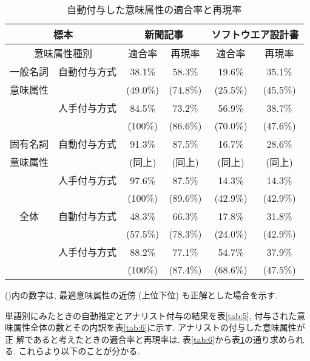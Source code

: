 \begin{table}[htbp]
  \caption{自動付与した意味属性の適合率と再現率}
  \label{tab:7}
  \begin{center}
    \leavevmode
    \begin{tabular}{|c|c|c|c|c|c|}
      \hline
      \multicolumn{2}{|c|}{標本} & \multicolumn{2}{|c|}{新聞記事} & \multicolumn{2}{|c|}{ソフトウエア設計書} \\\hline
      \multicolumn{2}{|c|}{意味属性種別} & 適合率 & 再現率 & 適合率 & 再現率 \\\hline
      一般名詞 & 自動付与方式 & 38.1\% & 58.3\% & 19.6\% & 35.1\% \\
      意味属性 & & (49.0\%) & (74.8\%) & (25.5\%) & (45.5\%) \\\cline{2-6}
      & 人手付与方式 & 84.5\% & 73.2\% & 56.9\% & 38.7\% \\
      & & (100\%) & (86.6\%) & (70.0\%) & (47.6\%) \\\hline
      固有名詞 & 自動付与方式 & 91.3\% & 87.5\% & 16.7\% & 28.6\% \\
      意味属性 & & (同上) & (同上) & (同上) & (同上) \\\cline{2-6}
      & 人手付与方式 & 97.6\% & 87.5\% & 14.3\% & 14.3\% \\
      & & (100\%) & (89.6\%) & (42.9\%) & (42.9\%) \\\hline
      全体 & 自動付与方式 & 48.3\% & 66.3\% & 17.8\% & 31.8\% \\
      & & (57.5\%) & (78.3\%) & (24.0\%) & (42.9\%) \\\cline{2-6}
      & 人手付与方式 & 88.2\% & 77.1\% & 54.7\% & 37.9\% \\
      & & (100\%) & (87.4\%) & (68.6\%) & (47.5\%) \\ \hline
    \end{tabular}

    \vspace{1.5mm} ()内の数字は, 最適意味属性の近傍 (上位下位) も正解とした場合を示す. 
  \end{center}
\end{table}

単語別にみたときの自動推定とアナリスト付与の結果を表\ref{tab:5}, 付与された意
味属性全体の数とその内訳を表\ref{tab:6}に示す. アナリストの付与した意味属性が正
解であると考えたときの適合率と再現率は, 表\ref{tab:6}から表\ref{tab:7}の通り求められる. 
これらより以下のことが分かる. \vspace{-0.2mm}

